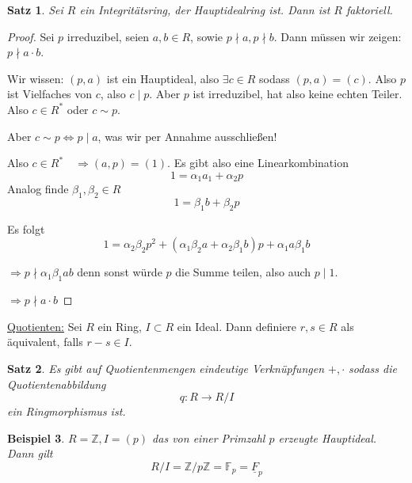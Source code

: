\documentclass[a4paper,12pt,numbers=noenddot,parskip=full]{scrartcl}
\newcommand{\setZ}{\mathbb{Z}}
\newcommand{\heading}{\underline}
\theoremstyle{dotless}
\newtheorem{theorem}{Satz}[section]
\newtheorem{example}[theorem]{Beispiel}
\theoremstyle{remark}
\begin{document}
	\begin{theorem}
		Sei $R$ ein Integritätsring, der Hauptidealring ist. Dann ist $R$ faktoriell.
	\end{theorem}

	\begin{proof}
		Sei $p$ irreduzibel, seien $a,b \in R$, sowie $p \nmid a, p \nmid b$. Dann müssen wir zeigen: $p \nmid a \cdot b$.
		
		Wir wissen: $(p,a)$ ist ein Hauptideal, also $\exists c \in R$ sodass $(p,a) = (c)$. Also $p$ ist Vielfaches von $c$, also $c \mid p$. Aber $p$ ist irreduzibel, hat also keine echten Teiler. Also $c \in R^*$ oder $c \sim p$.
		
		Aber $c \sim p \Leftrightarrow p \mid a$, was wir per Annahme ausschließen!
		
		Also $c \in R^* \quad\Rightarrow (a,p) = (1)$. Es gibt also eine Linearkombination
		\begin{equation*}
			1 = \alpha_1 a_1 + \alpha_2 p \tag{$*$}
		\end{equation*}
		Analog finde $\beta_1, \beta_2 \in R$
		\begin{equation*}
			1 = \beta_1 b + \beta_2 p \tag{$\leftmoon$}
		\end{equation*}
		
		Es folgt
		\begin{equation*}
			1 = \alpha_2 \beta_2 p^2 + (\alpha_1 \beta_2 a + \alpha_2 \beta_1 b)p + \alpha_1 a \beta_1 b
		\end{equation*}
		
		$\Rightarrow p \nmid \alpha_1 \beta_1 a b$ denn sonst würde $p$ die Summe teilen, also auch $p \mid 1$.
		
		$\Rightarrow p \nmid a \cdot b$
	\end{proof}

	\heading{Quotienten:} Sei $R$ ein Ring, $I \subset R$ ein Ideal. Dann definiere $r,s \in R$ als äquivalent, falls $r - s \in I$.
	
	\begin{theorem}
		Es gibt auf Quotientenmengen eindeutige Verknüpfungen $+, \cdot$ sodass die Quotientenabbildung
		\begin{equation*}
			q: R \to R/I
		\end{equation*}
		ein Ringmorphismus ist.
	\end{theorem}

	\begin{example}
		$R = \setZ, I = (p)$ das von einer Primzahl $p$ erzeugte Hauptideal. Dann gilt
		\begin{equation*}
			R/I = \setZ / p \setZ = \mathbb{F}_p = \underline{F}_p
		\end{equation*}
	\end{example}
\end{document}

